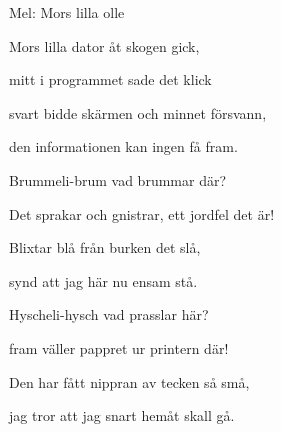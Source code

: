 \begin{SongText}
    \begin{SongInfo}
        Mel: Mors lilla olle
    \end{SongInfo}
    \begin{SongVerse}
        Mors lilla dator åt skogen gick,

        mitt i programmet sade det klick

        svart bidde skärmen och minnet försvann,

        den informationen kan ingen få fram.
    \end{SongVerse}
    \begin{SongVerse}
        Brummeli-brum vad brummar där?

        Det sprakar och gnistrar, ett jordfel det är!

        Blixtar blå från burken det slå,

        synd att jag här nu ensam stå.
    \end{SongVerse}
    \begin{SongVerse}
        Hyscheli-hysch vad prasslar här?

        fram väller pappret ur printern där!

        Den har fått nippran av tecken så små,

        jag tror att jag snart hemåt skall gå.
    \end{SongVerse}
\end{SongText}
